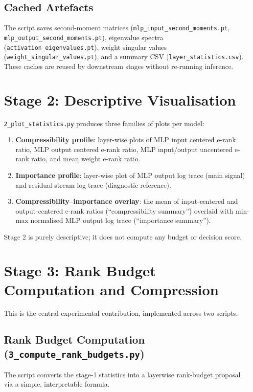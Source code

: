 \documentclass[11pt]{article}
\begin{document}
\subsection{Cached Artefacts}
The script saves second-moment matrices (\texttt{mlp\_input\_second\_moments.pt}, \texttt{mlp\_output\_second\_moments.pt}), eigenvalue spectra (\texttt{activation\_eigenvalues.pt}), weight singular values (\texttt{weight\_singular\_values.pt}), and a summary CSV (\texttt{layer\_statistics.csv}).  These caches are reused by downstream stages without re-running inference.

\section{Stage 2: Descriptive Visualisation}

\texttt{2\_plot\_statistics.py} produces three families of plots per model:
\begin{enumerate}
    \item \textbf{Compressibility profile}: layer-wise plots of MLP input centered e-rank ratio, MLP output centered e-rank ratio, MLP input/output uncentered e-rank ratio, and mean weight e-rank ratio.
    \item \textbf{Importance profile}: layer-wise plot of MLP output log trace (main signal) and residual-stream log trace (diagnostic reference).
    \item \textbf{Compressibility--importance overlay}: the mean of input-centered and output-centered e-rank ratios (``compressibility summary'') overlaid with min-max normalised MLP output log trace (``importance summary'').
\end{enumerate}
Stage 2 is purely descriptive; it does not compute any budget or decision score.

\section{Stage 3: Rank Budget Computation and Compression}

This is the central experimental contribution, implemented across two scripts.

\subsection{Rank Budget Computation (\texttt{3\_compute\_rank\_budgets.py})}

The script converts the stage-1 statistics into a layerwise rank-budget proposal via a simple, interpretable formula.
\end{document}
